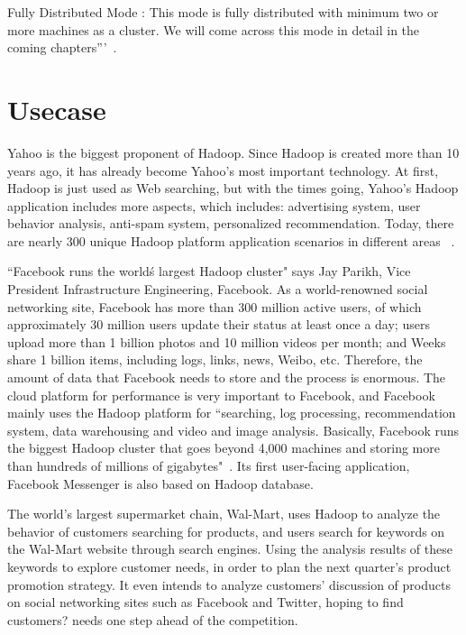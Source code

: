 Fully Distributed Mode : This mode is fully distributed with minimum two or more 
machines as a cluster. We will come across this mode in detail in the coming 
chapters'''~\cite{hid-sp18-508-hadoop}. 


\section{Usecase}
Yahoo is the biggest proponent of Hadoop. Since Hadoop is created more than 10 
years ago, it has already become Yahoo's most important technology. At first, 
Hadoop is just used as Web searching, but with the times going, Yahoo's Hadoop 
application includes more aspects, which includes: advertising system, user 
behavior analysis, anti-spam system, personalized recommendation. Today, there 
are nearly 300 unique Hadoop platform application scenarios in different 
areas ~\cite{hid-sp18-508-yahoo}.

``Facebook runs the world\'s largest Hadoop cluster" says Jay Parikh, Vice President 
Infrastructure Engineering, Facebook. As a world-renowned social networking site, Facebook has 
more than 300 million active users, of which approximately 30 million users update 
their status at least once a day; users upload more than 1 billion photos and 10 
million videos per month; and Weeks share 1 billion items, including logs, links, 
news, Weibo, etc. Therefore, the amount of data that Facebook needs to store and 
the process is enormous. The cloud platform for performance is very important to Facebook, 
and Facebook mainly uses the Hadoop platform for ``searching, log processing, 
recommendation system, data warehousing and video and image analysis. Basically, 
Facebook runs the biggest Hadoop cluster that goes beyond 4,000 machines and storing 
more than hundreds of millions of gigabytes"~\cite{hid-sp18-508-fb}. Its first 
user-facing application, Facebook Messenger is also based on Hadoop database.

The world's largest supermarket chain, Wal-Mart, uses Hadoop to analyze the behavior 
of customers searching for products, and users search for keywords on the Wal-Mart 
website through search engines. Using the analysis results of these keywords to 
explore customer needs, in order to plan the next quarter's product promotion strategy. 
It even intends to analyze customers' discussion of products on social networking 
sites such as Facebook and Twitter, hoping to find customers? needs one step ahead 
of the competition.




